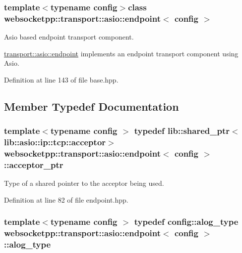\subsubsection*{template$<$typename config$>$class websocketpp\+::transport\+::asio\+::endpoint$<$ config $>$}

Asio based endpoint transport component. 

\hyperlink{classwebsocketpp_1_1transport_1_1asio_1_1endpoint}{transport\+::asio\+::endpoint} implements an endpoint transport component using Asio. 

Definition at line 143 of file base.\+hpp.



\subsection{Member Typedef Documentation}
\hypertarget{classwebsocketpp_1_1transport_1_1asio_1_1endpoint_aaff1078ca1ea0fa4f47bbabcae255c16}{}
\subsubsection[{acceptor\+\_\+ptr}]{\setlength{\rightskip}{0pt plus 5cm}template$<$typename config $>$ typedef lib\+::shared\+\_\+ptr$<$lib\+::asio\+::ip\+::tcp\+::acceptor$>$ {\bf websocketpp\+::transport\+::asio\+::endpoint}$<$ config $>$\+::{\bf acceptor\+\_\+ptr}}\label{classwebsocketpp_1_1transport_1_1asio_1_1endpoint_aaff1078ca1ea0fa4f47bbabcae255c16}


Type of a shared pointer to the acceptor being used. 



Definition at line 82 of file endpoint.\+hpp.

\hypertarget{classwebsocketpp_1_1transport_1_1asio_1_1endpoint_acba708e66a47d4aae9a053d364585b81}{}
\subsubsection[{alog\+\_\+type}]{\setlength{\rightskip}{0pt plus 5cm}template$<$typename config $>$ typedef config\+::alog\+\_\+type {\bf websocketpp\+::transport\+::asio\+::endpoint}$<$ config $>$\+::{\bf alog\+\_\+type}}\label{classwebsocketpp_1_1transport_1_1asio_1_1endpoint_acba708e66a47d4aae9a053d364585b81}


